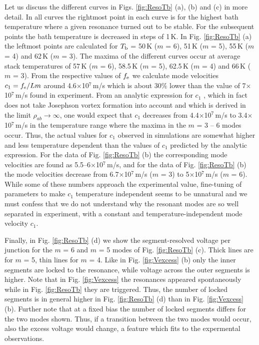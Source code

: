 \documentclass[aps,twocolumn,prb,showpacs,preprintnumbers,superscriptaddress,amsmath,amssymb,longbibliography]{revtex4-1}
\begin{document}
Let us discuss the different curves in Figs. \ref{fig:ResoTb} (a), (b) and (c) in more detail. In all curves the rightmost point in each curve is for the highest bath temperature where a given resonance turned out to be stable. For the subsequent points the bath temperature is decreased in steps of 1\,K. In Fig. \ref{fig:ResoTb} (a) the leftmost points are calculated for $T_{\rm b}$ = 50\,K ($m$ = 6), 51\,K ($m$ = 5), 55\,K ($m$ = 4) and 62\,K ($m$ = 3). The maxima of the different curves occur at average stack temperatures of 57\,K ($m$ = 6), 58.5\,K ($m$ = 5), 62.5\,K ($m$ = 4) and 66\,K ($m$ = 3). From the respective values of $f_{\rm e}$ we calculate mode velocities $c_1 = f_{\rm e}/Lm$ around 4.6$\times$10$^7$\,m/s which is about 30$\%$ lower than the value of 7$\times$10$^7$\,m/s found in experiment. From an analytic expression for $c_1$ \cite{Wang09a}, which in fact does not take Josephson vortex formation into account and which is derived in the limit $\rho_{ab} \rightarrow \infty$, one would expect that $c_1$ decreases from 4.4$\times$10$^7$\,m/s to 3.4$\times$10$^7$\,m/s in the temperature range where the maxima in the $m$ = 3 -- 6 modes occur. Thus, the actual values for $c_1$ observed in simulations are somewhat higher and less temperature dependent than the values of $c_1$ predicted by the analytic expression. For the data of Fig. \ref{fig:ResoTb} (b) the corresponding mode velocities are found as 5.5--6$\times$10$^7$\,m/s, and for the data of Fig. \ref{fig:ResoTb} (b) the mode velocities decrease from 6.7$\times$10$^7$\,m/s ($m$ = 3) to 5$\times$10$^7$\,m/s ($m$ = 6). While some of these numbers approach the experimental value, fine-tuning of parameters to make $c_1$ temperature independent seems to be unnatural and we must confess that we do not understand why the resonant modes are so well separated in experiment, with a constant and temperature-independent mode velocity $c_1$. 

Finally, in Fig. \ref{fig:ResoTb} (d) we show the segment-resolved voltage per junction for the $m$ = 6 and $m$ = 5 modes of Fig. \ref{fig:ResoTb} (c). Thick lines are for $m$ = 5, thin lines for $m$ = 4. Like in Fig. \ref{fig:Vexcess} (b) only the inner segments are locked to the resonance, while voltage across the outer segments is higher. Note that in Fig. \ref{fig:Vexcess} the resonances appeared spontaneously while in Fig. \ref{fig:ResoTb} they are triggered. Thus, the number of locked segments is in general higher in Fig. \ref{fig:ResoTb} (d) than in Fig. \ref{fig:Vexcess} (b). Further note that at a fixed bias the number of locked segments differs for the two modes shown. Thus, if a transition between the two modes would occur, also the excess voltage would change, a feature which fits to the expermental observations. 
\end{document}
